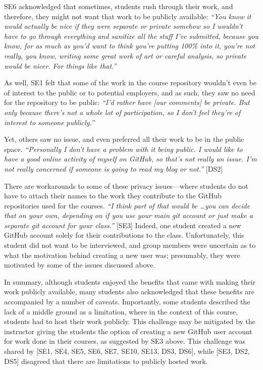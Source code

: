 SE6 acknowledged that sometimes, students rush through their work, and therefore, they might not want that work to be publicly available: \textit{``You know it would actually be nice if they were separate or private somehow so I wouldn't have to go through everything and sanitize all the stuff I've submitted, because you know, for as much as you'd want to think you're putting 100\% into it, you're not really, you know, writing some great work of art or careful analysis, so private would be nicer. For things like that.''}

As well, SE1 felt that some of the work in the course repository wouldn't even be of interest to the public or to potential employers, and as such, they saw no need for the repository to be public: \textit{``I'd rather have [our comments] be private. But only because there's not a whole lot of participation, so I don't feel they're of interest to someone publicly.''}


Yet, others saw no issue, and even preferred all their work to be in the public space. \textit{``Personally I don't have a problem with it being public. I would like to have a good online activity of myself on GitHub, so that's not really an issue. I'm not really concerned if someone is going to read my blog or not.''} [DS2]

There are workarounds to some of these privacy issues---where students do not have to attach their names to the work they contribute to the GitHub repositories used for the courses. \textit{``I think part of that would be \ldots you can decide that on your own, depending on if you use your main git account or just make a separate git account for your class.''} [SE3] Indeed, one student created a new GitHub account solely for their contributions to the class. Unfortunately, this student did not want to be interviewed, and group members were uncertain as to what the motivation behind creating a new user was; presumably, they were motivated by some of the issues discussed above.

In summary, although students enjoyed the benefits that came with making their work publicly available, many students also acknowledged that these benefits are accompanied by a number of caveats. Importantly, some students described the lack of a middle ground as a limitation, where in the context of this course, students had to host their work publicly. This challenge may be mitigated by the instructor giving the students the option of creating a new GitHub user account for work done in their courses, as suggested by SE3 above. This challenge was shared by [SE1, SE4, SE5, SE6, SE7, SE10, SE13, DS3, DS6], while [SE3, DS2, DS5] disagreed that there are limitations to publicly hosted work. \\

